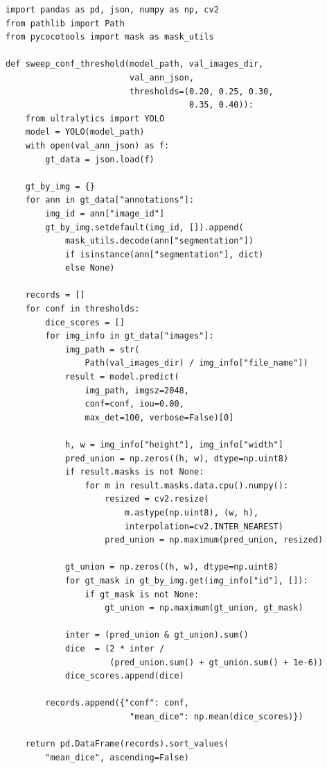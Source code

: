 \documentclass[11pt,a4paper,openany]{report}
\begin{document}
\begin{lstlisting}[caption={Threshold sweep on validation set},label={lst:conf_sweep}]
import pandas as pd, json, numpy as np, cv2
from pathlib import Path
from pycocotools import mask as mask_utils

def sweep_conf_threshold(model_path, val_images_dir,
                         val_ann_json,
                         thresholds=(0.20, 0.25, 0.30,
                                     0.35, 0.40)):
    from ultralytics import YOLO
    model = YOLO(model_path)
    with open(val_ann_json) as f:
        gt_data = json.load(f)

    gt_by_img = {}
    for ann in gt_data["annotations"]:
        img_id = ann["image_id"]
        gt_by_img.setdefault(img_id, []).append(
            mask_utils.decode(ann["segmentation"])
            if isinstance(ann["segmentation"], dict)
            else None)

    records = []
    for conf in thresholds:
        dice_scores = []
        for img_info in gt_data["images"]:
            img_path = str(
                Path(val_images_dir) / img_info["file_name"])
            result = model.predict(
                img_path, imgsz=2048,
                conf=conf, iou=0.00,
                max_det=100, verbose=False)[0]

            h, w = img_info["height"], img_info["width"]
            pred_union = np.zeros((h, w), dtype=np.uint8)
            if result.masks is not None:
                for m in result.masks.data.cpu().numpy():
                    resized = cv2.resize(
                        m.astype(np.uint8), (w, h),
                        interpolation=cv2.INTER_NEAREST)
                    pred_union = np.maximum(pred_union, resized)

            gt_union = np.zeros((h, w), dtype=np.uint8)
            for gt_mask in gt_by_img.get(img_info["id"], []):
                if gt_mask is not None:
                    gt_union = np.maximum(gt_union, gt_mask)

            inter = (pred_union & gt_union).sum()
            dice  = (2 * inter /
                     (pred_union.sum() + gt_union.sum() + 1e-6))
            dice_scores.append(dice)

        records.append({"conf": conf,
                         "mean_dice": np.mean(dice_scores)})

    return pd.DataFrame(records).sort_values(
        "mean_dice", ascending=False)
\end{lstlisting}
\end{document}
